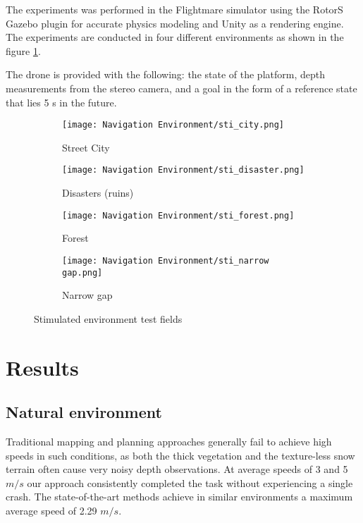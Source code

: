 The experiments was performed in the
Flightmare simulator using the RotorS Gazebo plugin for
accurate physics modeling and Unity as a rendering engine. The
experiments are conducted in four different environments as shown in the figure \ref{fig:stimulated envt}.

The drone is provided with the following: the state of the
platform, depth measurements from the stereo camera, and a goal in
the form of a reference state that lies 5 s in the future.

\begin{figure}[!h]
	\centering
	\begin{subfigure}[b]{0.48\textwidth}
		\centering
		\texttt{[image: Navigation Environment/sti\_city.png]}
		\caption{Street City}
	\end{subfigure}
	\hfill
	\begin{subfigure}[b]{0.48\textwidth}
		\centering
		\texttt{[image: Navigation Environment/sti\_disaster.png]}
		\caption{Disasters (ruins)}
	\end{subfigure}
	\hfill	
	\begin{subfigure}[b]{0.48\textwidth}
		\centering
		\texttt{[image: Navigation Environment/sti\_forest.png]}
		\caption{Forest}
	\end{subfigure}
	\hfill
	\begin{subfigure}[b]{0.48\textwidth}
		\centering
		\texttt{[image: Navigation Environment/sti\_narrow gap.png]}
		\caption{Narrow gap}
	\end{subfigure}
	
	\caption{Stimulated environment test fields}
	\label{fig:stimulated envt}
\end{figure}


\section{Results}

\subsection{Natural environment}
Traditional mapping and planning approaches generally fail to achieve high speeds in such conditions, as
both the thick vegetation and the texture-less snow terrain often cause
very noisy depth observations. At average speeds of 3 and 5 $m/s$ our approach consistently completed the task without experiencing a single crash. 
The state-of-the-art methods achieve in similar environments a maximum average
speed of 2.29 $m/s$.

